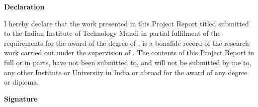 \begin{flushright}
\huge{\textbf{Declaration}}
\end{flushright}
I hereby declare that the work presented in this Project Report titled \ttitle{} submitted to the Indian Institute of Technology Mandi in partial fulfilment of the requirements for the award of the degree of \degree, is a bonafide record of the research work carried out under the supervision of \supname. The contents of this Project Report in full or in parts, have not been submitted to, and will not be submitted by me to, any other Institute or University in India or abroad for the award of any degree or diploma.
\vspace{2cm}
\begin{flushright}
\large{\textbf{Signature}}\\
\emph{\authorname}\\
\rn
\end{flushright}
